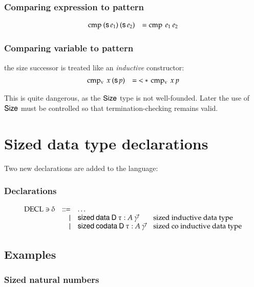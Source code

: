 \subsubsection{Comparing expression to pattern}
\[
\begin{array}[t]{ll}
\operatorname{cmp} \: (\mathsf{s}\, e_1) \: (\mathsf{s}\, e_2) & = \operatorname{cmp} \: e_1 \: e_2 \\
\end{array}
\]

\subsubsection{Comparing variable to pattern}
the size successor is treated like an \emph{inductive} constructor:
\[
\begin{array}[t]{ll}
\operatorname{cmp_v} \: x \: (\mathsf{s}\, p) & = \: < * \: \operatorname{cmp_v} \: x \: p\\
\end{array}
\]

This is quite dangerous, as the $\mathsf{Size}$ type is not well-founded.
Later the use of $\mathsf{Size}$ must be controlled so that termination-checking remains valid.

\section{Sized data type declarations}

\newcommand{\sizecon}[4]{#1\vdash#2\mbox{ \textbf{sizeCon} }#3\:#4}
\newcommand{\sizeuse}[4]{#1\vdash#2\mbox{ \textbf{sizeUse} }#3\:#4}

Two new declarations are added to the language:
\subsubsection{Declarations}
\[
\begin{array}{lrll}
\operatorname{DECL} \ni \delta & ::= & \ldots & \\
& \mid & \mathsf{sized}\: \mathsf{data}\: \mathsf{D} \: \tau : A \: \vec{\gamma} & \mbox{sized inductive data type}\\ 
& \mid & \mathsf{sized}\: \mathsf{codata}\: \mathsf{D} \: \tau : A \: \vec{\gamma} & \mbox{sized co inductive data type} \\
\end{array}
\]

\subsection{Examples}


\subsubsection{Sized natural numbers}

